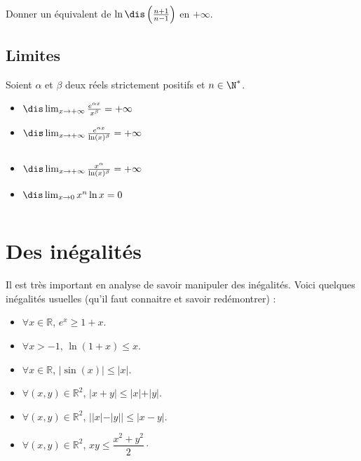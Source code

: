 \documentclass[a4paper,10pt]{report}
\begin{document}
\begin{exa} Donner un équivalent de $\ln \dis \left( \frac{n+1}{n-1} \right)$ en $+ \infty$.
\end{exa}
 
 \subsection{Limites}
 

\begin{thm}
Soient $\alpha$ et $\beta$ deux réels strictement positifs et $n \in \N^*$.
\begin{multicols}{2}
\begin{itemize}
\item $\dis \lim_{x \rightarrow +\infty} \frac{e^{\alpha x}}{x^{\beta}}= + \infty$
\item $\dis \lim_{x \rightarrow +\infty} \frac{e^{\alpha x}}{\ln(x)^{\beta}}= + \infty$


$\phantom{}$
\vspace{0.1cm}

\columnbreak
\item $\dis \lim_{x \rightarrow +\infty} \frac{x^{\alpha}}{\ln(x)^{\beta}}= + \infty$
\item $\dis \lim_{x\to 0} x^n \ln x =0 $

$\phantom{}$
\vspace{0.1cm}

\end{itemize}
\end{multicols}
\end{thm}

\section{Des inégalités}

\noindent Il est très important en analyse de savoir manipuler des inégalités. Voici quelques inégalités usuelles (qu'il faut connaitre et savoir redémontrer) : 

\begin{multicols}{2}
\begin{itemize}
\item $\forall x \in \mathbb{R}$, $e^x \geq 1+x$.
\item $\forall x > -1$, $\ln(1+x) \leq x$.
\item $\forall x \in \mathbb{R}$, $\vert \sin(x) \vert \leq \vert x \vert$.
\columnbreak
\item $\forall (x,y) \in \mathbb{R}^2$, $\vert x+y \vert \leq \vert x \vert + \vert y \vert$.
\item $\forall (x,y) \in \mathbb{R}^2$, $\vert \vert x \vert - \vert y \vert \vert \leq \vert x-y \vert$.
\item $\forall (x,y) \in \mathbb{R}^2$, $xy \leq \dfrac{x^2+y^2}{2}\cdot$
\end{itemize}
\end{multicols}






 
\end{document}
